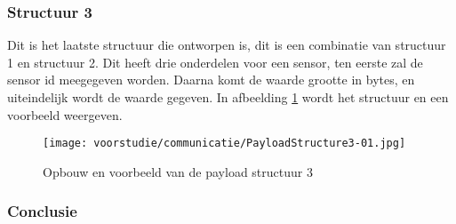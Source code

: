 \subsubsection{Structuur 3}
Dit is het laatste structuur die ontworpen is, dit is een combinatie van structuur 1 en structuur 2. Dit heeft drie onderdelen voor een sensor, ten eerste zal de sensor id meegegeven worden. Daarna komt de waarde grootte in bytes, en uiteindelijk wordt de waarde gegeven. In afbeelding \ref{fig:Structure3} wordt het structuur en een voorbeeld weergeven.
\begin{figure}[h!]
	\label{fig:Structure3}
	\caption{Opbouw en voorbeeld van de payload structuur 3}
	\texttt{[image: voorstudie/communicatie/PayloadStructure3-01.jpg]}
\end{figure}

\subsubsection{Conclusie}
